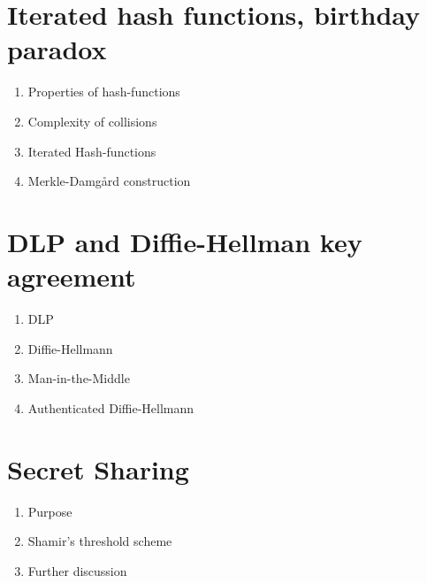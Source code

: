 \documentclass{article}
\begin{document}
\section{Iterated hash functions, birthday paradox}
\begin{enumerate}
\item Properties of hash-functions
\item Complexity of collisions
\item Iterated Hash-functions
\item Merkle-Damgård construction
\end{enumerate}
\clearpage

\section{DLP and Diffie-Hellman key agreement}
\begin{enumerate}
\item DLP
\item Diffie-Hellmann
\item Man-in-the-Middle
\item Authenticated Diffie-Hellmann
\end{enumerate}
\clearpage

\section{Secret Sharing}
\begin{enumerate}
\item Purpose
\item Shamir's threshold scheme
\item Further discussion
\end{enumerate}
\end{document}
